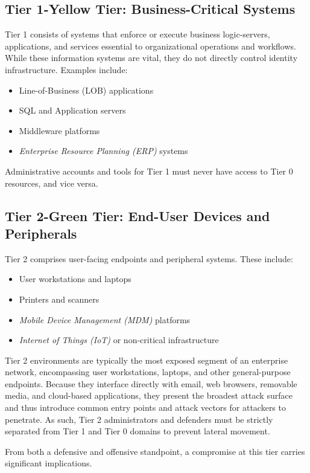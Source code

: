 \subsection{Tier 1-Yellow Tier: Business-Critical Systems}
Tier 1 consists of systems that enforce or execute business logic-servers, applications, and services essential to organizational operations and workflows. While these information systems are vital, they do not directly control identity infrastructure. Examples include:
\begin{itemize}
    \item Line-of-Business (LOB) applications
    \item SQL and Application servers
    \item Middleware platforms
    \item \textit{Enterprise Resource Planning (ERP)} systems
\end{itemize}

Administrative accounts and tools for Tier 1 must never have access to Tier 0 resources, and vice versa.

\subsection{Tier 2-Green Tier: End-User Devices and Peripherals}
Tier 2 comprises user-facing endpoints and peripheral systems. These include:
\begin{itemize}
    \item User workstations and laptops
    \item Printers and scanners
    \item \textit{Mobile Device Management (MDM)} platforms
    \item \textit{Internet of Things (IoT)} or non-critical infrastructure
\end{itemize}

Tier 2 environments are typically the most exposed segment of an enterprise network, encompassing user workstations, laptops, and other general-purpose endpoints. Because they interface directly with email, web browsers, removable media, and cloud-based applications, they present the broadest attack surface and thus introduce common entry points and attack vectors for attackers to penetrate. As such, Tier 2 administrators and defenders must be strictly separated from Tier 1 and Tier 0 domains to prevent lateral movement.

From both a defensive and offensive standpoint, a compromise at this tier carries significant implications.

